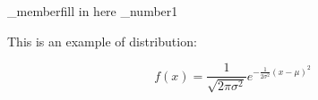 \documentclass[11pt]{report}
\begin{document}
\gr_member{fill in here}
\hw_number{1}

\maketitle


This is an example of distribution: 

$$f(x) = \frac{1}{\sqrt{2 \pi \sigma^2}} e^{- \frac{1}{2 \sigma^2} (x - \mu)^2 }$$
\end{document}
